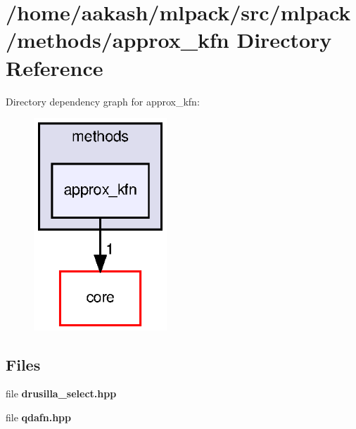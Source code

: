 \section{/home/aakash/mlpack/src/mlpack/methods/approx\+\_\+kfn Directory Reference}
\label{dir_d653de0e5247f0f2599149f8b16e0b6e}
Directory dependency graph for approx\+\_\+kfn\+:
\nopagebreak
\begin{figure}[H]
\begin{center}
\leavevmode
\includegraphics[width=142pt]{dir_d653de0e5247f0f2599149f8b16e0b6e_dep}
\end{center}
\end{figure}
\subsection*{Files}
\begin{DoxyCompactItemize}
\item 
file \textbf{ drusilla\+\_\+select.\+hpp}
\item 
file \textbf{ qdafn.\+hpp}
\end{DoxyCompactItemize}
